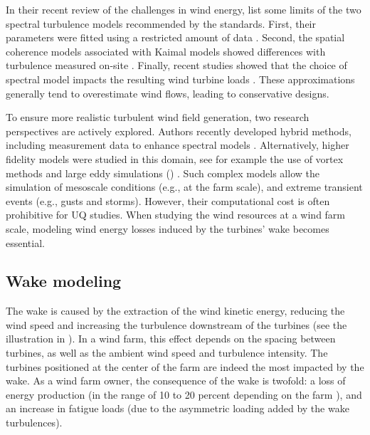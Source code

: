 In their recent review of the challenges in wind energy, \citet{veers_2019_review} list some limits of the two spectral turbulence models recommended by the standards. 
First, their parameters were fitted using a restricted amount of data \citep{dimitrov_2017_turbulence_models_on_loads}. 
Second, the spatial coherence models associated with Kaimal models showed differences with turbulence measured on-site \citep{saranyasoontorn_2004}.  
Finally, recent studies showed that the choice of spectral model impacts the resulting wind turbine loads \citep{doubrawa_2019}. 
These approximations generally tend to overestimate wind flows, leading to conservative designs. 

To ensure more realistic turbulent wind field generation, two research perspectives are actively explored. 
Authors recently developed hybrid methods, including measurement data to enhance spectral models \citep{dimitrov_2017_constrained_turbulence}. 
Alternatively, higher fidelity models were studied in this domain, see for example the use of vortex methods \citep{branlard_2017_book} and large eddy simulations () \citep{doubrawa_2019,bui_2022_mesoscale_LES}.  
Such complex models allow the simulation of mesoscale conditions (e.g., at the farm scale), and extreme transient events (e.g., gusts and storms). 
However, their computational cost is often prohibitive for UQ studies. 
When studying the wind resources at a wind farm scale, modeling wind energy losses induced by the turbines' wake becomes essential. 



\subsection{Wake modeling}\label{sec:222}

The wake is caused by the extraction of the wind kinetic energy, reducing the wind speed and increasing the turbulence downstream of the turbines (see the illustration in ). 
In a wind farm, this effect depends on the spacing between turbines, as well as the ambient wind speed and turbulence intensity. 
The turbines positioned at the center of the farm are indeed the most impacted by the wake. 
As a wind farm owner, the consequence of the wake is twofold: a loss of energy production (in the range of 10 to 20 percent depending on the farm \citealp[Chapt. 9]{burton_2021_wind_handbook}), and an increase in fatigue loads (due to the asymmetric loading added by the wake turbulences).

